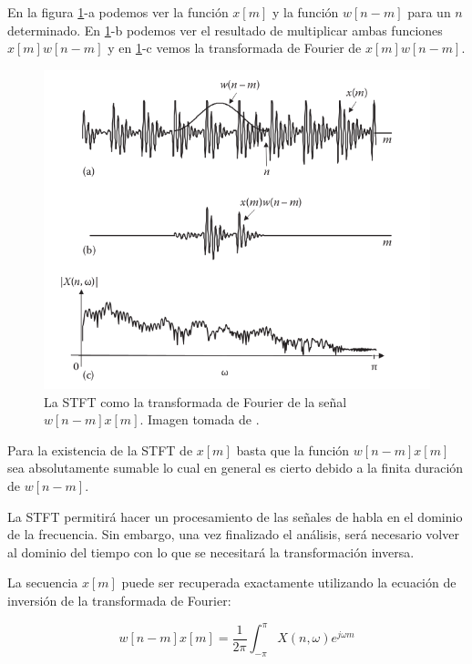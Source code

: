 En la figura \ref{fig:ch2_stft_explained}-a podemos ver la función $x[m]$ y la función $w[n-m]$ para un $n$ determinado. En \ref{fig:ch2_stft_explained}-b podemos ver el resultado de multiplicar ambas funciones $x[m]w[n-m]$ y en \ref{fig:ch2_stft_explained}-c vemos la transformada de Fourier de $x[m]w[n-m]$.

\begin{figure}
	\centering
	\centerline{\includegraphics[scale=0.7]{images/ch2/stft_explained.png}}
	\caption{La STFT como la transformada de Fourier de la señal $w[n-m] x[m]$. Imagen tomada de \cite{speech_enhancement_theory_and_practice}.}
	\label{fig:ch2_stft_explained}
\end{figure}

Para la existencia de la STFT de $x[m]$ basta que la función $w[n-m]x[m]$ sea absolutamente sumable \cite{oppenheim_schafer} lo cual en general es cierto debido a la finita duración de $w[n-m]$.

La STFT permitirá hacer un procesamiento de las señales de habla en el dominio de la frecuencia. Sin embargo, una vez finalizado el análisis, será necesario volver al dominio del tiempo con lo que se necesitará la transformación inversa.

La secuencia $x[m]$ puede ser recuperada exactamente utilizando la ecuación de inversión de la transformada de Fourier:

\begin{equation*}
	w[n-m] x[m] = \frac{1}{2 \pi} \int_{- \pi}^{\pi} X(n, \omega) e^{j \omega m}
\end{equation*}


